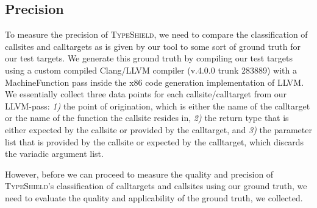 \subsection{Precision}
\label{section:typeshieldprecision}

To measure the precision of \textsc{TypeShield}, we need to compare the classification of callsites and calltargets as is given by our tool to
some sort of ground truth for our test targets. We generate this ground truth by compiling our test targets using a custom compiled Clang/LLVM
compiler (v.4.0.0 trunk 283889) with a MachineFunction pass inside the x86 code generation implementation of LLVM. We essentially 
collect three data points for each callsite/calltarget from our LLVM-pass:
\textit{1)} the point of origination, which is either the name of the calltarget or the name of the function the callsite resides in, 
\textit{2)} the return type that is either expected by the callsite or provided by the calltarget, and 
\textit{3)} the parameter list that is provided by the callsite or expected by the calltarget, which discards the variadic argument list.

However, before we can proceed to measure the quality and precision of \textsc{TypeShield}'s classification of calltargets and callsites
using our ground truth, we need to evaluate the quality and applicability of the ground truth, we collected.

